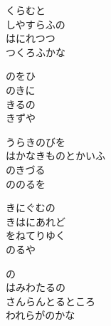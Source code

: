 \documentclass[10pt,b5j]{tarticle} %
\begin{document}
\vspace{1.5em} %
\newcommand{\linespace}{0.5em} %
\newcommand{\blocksize}{0.5\hsize} %
\begin{enumerate} %
    \begin{minipage}[c]{\blocksize}
    
        \vspace{\linespace}
        \item
        くらむと\\
        しやすらふの\\
        はにれつつ\\
        つくろふかな
        
        \vspace{\linespace}
        \item
        のをひ\\
        のきに\\
        きるの\\
        きずや
        
        \vspace{\linespace}
        \item
        うらきのびを\\
        はかなきものとかいふ\\
        のきづる\\
        ののるを
        
        \vspace{\linespace}
        \item
        きにぐむの\\
        きはにあれど\\
        をねてりゆく\\
        のるや
        
        \vspace{\linespace}
        \item
        の\\
        はみわたるの\\
        さんらんとるところ\\
        われらがのかな
        

\end{minipage}
\end{enumerate}
\end{document}
